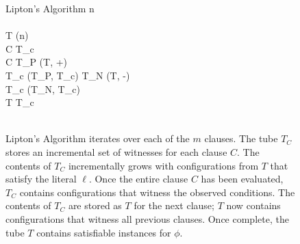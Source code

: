 


\begin{figure}[htbp]
\begin{center}

	\begin{pseudocode}{Lipton's Algorithm}{\phi}
	n  \phi \\
	\\
	T \GETS {}(n) \\
	\FOREACH {} C  \phi \DO
		\BEGIN
		T_c \GETS \emptyset \\
		\FOREACH {} \ell {} C \DO
			\BEGIN
				\IF \ell {} \THEN
					\BEGIN
						T_P \GETS {}(T, +\ell)\\
						T_c \GETS {}(T_P, T_c)						
					\END
				\ELSE
					\BEGIN
						T_N \GETS {}(T, -\ell)\\
						T_c \GETS {}(T_N, T_c)						
					\END
			\END
		\\
		T \GETS T_c\\
		\END
	\\
	\end{pseudocode}


\caption{{\sc Lipton's Algorithm} iterates over each of the $m$ clauses.  The tube $T_C$ stores an incremental set of witnesses for each clause $C$.  The contents of $T_C$ incrementally grows with configurations from $T$ that satisfy the literal $\ell$.  Once the entire clause $C$ has been evaluated, $T_C$ contains configurations that witness the observed conditions.  The contents of $T_C$ are stored as $T$ for the next clause; $T$ now contains configurations that witness all previous clauses.  Once complete, the tube $T$ contains satisfiable instances for $\phi$.}
\label{liptonAlgorithm}
\end{center}
\end{figure}

